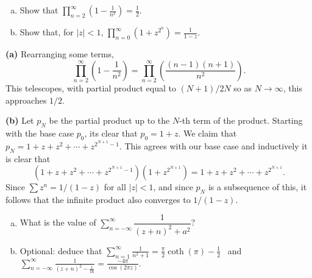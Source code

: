 \documentclass[11pt,letterpaper]{article}
\begin{document}
\begin{problem}\noindent
    \begin{enumerate}[(a)]
        \item Show that $\displaystyle\prod\limits_{n=2}^\infty \left(1-\frac{1}{n^2}\right)=\frac{1}{2}$.
        \item Show that, for $|z|<1$, $\displaystyle \prod\limits_{n=0}^\infty (1+z^{2^n})=\frac{1}{1-z}$.
    \end{enumerate}
\end{problem}

\begin{solution}
    \textbf{(a)} Rearranging some terms,
    \[
        \prod^\infty_{n=2}\left(1-\frac{1}{n^2}\right)=\prod^\infty_{n=2}\left(\frac{(n-1)(n+1)}{n^2}\right).
    \] 
    This telescopes, with partial product equal to $(N+1)/2N$ so as $N\to \infty$, this approaches $1/2$.

    \textbf{(b)} Let $p_N$ be the partial product up to the $N$-th term of the product. Starting with the base case $p_0$, its clear that $p_0=1+z$. We claim that $p_N = 1+z+z^2+\cdots +z^{2^{N+1}-1}$. This agrees with our base case and inductively it is clear that
    \[
        \left(1+z+z^2+\cdots+z^{2^{N+1}-1}\right)\left(1+z^{2^{N+1}}\right)=1+z+z^2+\cdots+z^{2^{N+1}}.
    \] 
    Since $\sum z^n = 1/(1-z)$ for all $|z|<1$, and since $p_N$ is a subsequence of this, it follows that the infinite product also converges to $1/(1-z)$.
\end{solution}

\begin{problem}\noindent
    \begin{enumerate}[(a)]
        \item What is the value of $\displaystyle \sum\limits_{n=-\infty}^\infty \dfrac{1}{(z+n)^2+a^2}$?
        \item Optional: deduce that $\displaystyle \sum_{n=1}^\infty \frac{1}{n^2+1}=\frac{\pi}{2}\coth(\pi)-\frac12$ \ and $\displaystyle \sum_{n=-\infty}^\infty \frac{1}{(z+n)^2-\frac{1}{16}}=\frac{-4\pi}{\cos(2\pi z)}.$
    \end{enumerate}
\end{problem}
\end{document}

